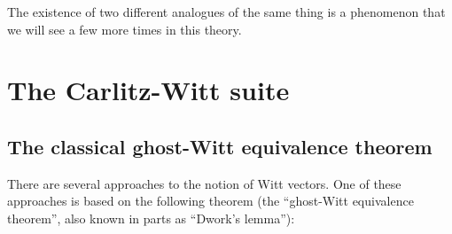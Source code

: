 \documentclass[numbers=enddot,12pt,final,onecolumn,notitlepage]{scrartcl}%
\theoremstyle{definition}
\begin{document}
The existence of two different analogues of the same thing is a phenomenon
that we will see a few more times in this theory.

\section{\label{sect.carlitzwitt}The Carlitz-Witt suite}

\subsection{The classical ghost-Witt equivalence theorem}

There are several approaches to the notion of Witt vectors. One of these
approaches is based on the following theorem (the ``ghost-Witt equivalence
theorem'', also known in parts as \textquotedblleft Dwork's
lemma\textquotedblright):
\end{document}
